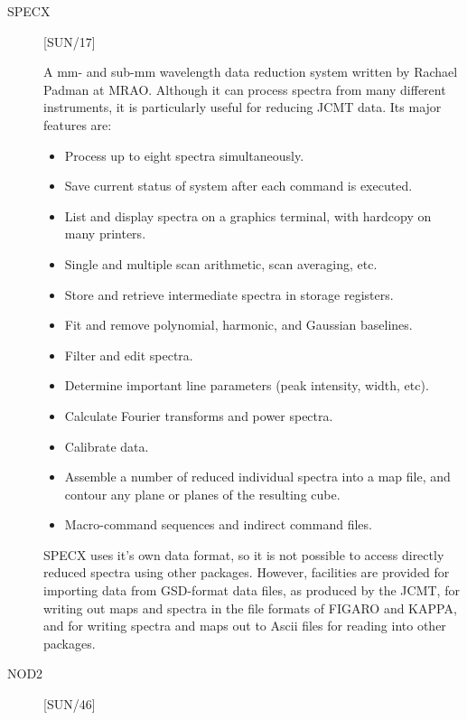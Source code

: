 \begin{description}

\item [SPECX] \hfill [SUN/17]

A mm- and sub-mm wavelength data reduction system written
by Rachael Padman at MRAO.
Although it can process spectra from many different instruments, it is
particularly useful for reducing JCMT data.
Its major features are:
\begin{itemize}
\item Process up to eight spectra simultaneously.
\item Save current status of system after each command is executed.
\item List and display spectra on a graphics terminal, with hardcopy on many
printers.
\item Single and multiple scan arithmetic, scan averaging, etc.
\item Store and retrieve intermediate spectra in storage registers.
\item Fit and remove polynomial, harmonic, and Gaussian baselines.
\item Filter and edit spectra.
\item Determine important line parameters (peak intensity, width, etc).
\item Calculate Fourier transforms and power spectra.
\item Calibrate data.
\item Assemble a number of reduced individual spectra into a map file, and
contour any plane or planes of the resulting cube.
\item Macro-command sequences and indirect command files.
\end{itemize}
SPECX uses it's own data format, so it is not possible to access directly
reduced spectra using other packages.
However, facilities are provided for importing data from GSD-format data files,
as produced by the JCMT, for writing out maps and spectra in the file formats
of FIGARO and KAPPA, and for writing spectra and maps out to Ascii files for
reading into other packages.

\item [NOD2] \hfill [SUN/46]


\end{description}
